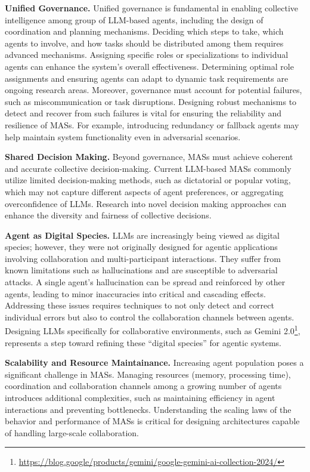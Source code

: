 \documentclass[acmsmall,nonacm]{acmart}
\begin{document}
        \textbf{Unified Governance.} Unified governance is fundamental in enabling collective intelligence among group of LLM-based agents, including the design of coordination and planning mechanisms. Deciding which steps to take, which agents to involve, and how tasks should be distributed among them requires advanced mechanisms. Assigning specific roles or specializations to individual agents can enhance the system's overall effectiveness. Determining optimal role assignments and ensuring agents can adapt to dynamic task requirements are ongoing research areas. Moreover, governance must account for potential failures, such as miscommunication or task disruptions. Designing robust mechanisms to detect and recover from such failures is vital for ensuring the reliability and resilience of MASs. For example, introducing redundancy or fallback agents may help maintain system functionality even in adversarial scenarios.

        \textbf{Shared Decision Making.} Beyond governance, MASs must achieve coherent and accurate collective decision-making. Current LLM-based MASs commonly utilize limited decision-making methods, such as dictatorial or popular voting, which may not capture different aspects of agent preferences, or aggregating overconfidence of LLMs. Research into novel decision making approaches can enhance the diversity and fairness of collective decisions. 

        \textbf{Agent as Digital Species.} LLMs are increasingly being viewed as digital species; however, they were not originally designed for agentic applications involving collaboration and multi-participant interactions. They suffer from known limitations such as hallucinations and are susceptible to adversarial attacks. A single agent’s hallucination can be spread and reinforced by other agents, leading to minor inaccuracies into critical and cascading effects. Addressing these issues requires techniques to not only detect and correct individual errors but also to control the collaboration channels between agents. Designing LLMs specifically for collaborative environments, such as Gemini 2.0\footnote{\url{https://blog.google/products/gemini/google-gemini-ai-collection-2024/}}, represents a step toward refining these ``digital species'' for agentic systems.

        \textbf{Scalability and Resource Maintainance.} Increasing agent population poses a significant challenge in MASs. Managing resources (memory, processing time), coordination and collaboration channels among a growing number of agents introduces additional complexities, such as maintaining efficiency in agent interactions and preventing bottlenecks. Understanding the scaling laws of the behavior and performance of MASs is critical for designing architectures capable of handling large-scale collaboration.
\end{document}
